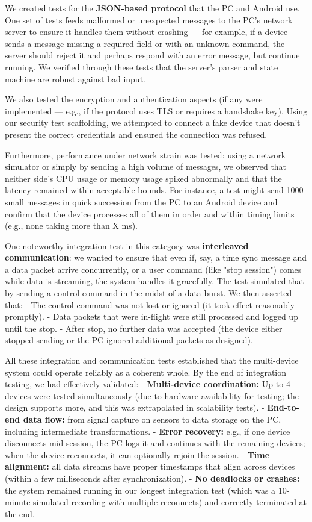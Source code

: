\documentclass[11pt,a4paper]{report}
\begin{document}
We created tests for the \textbf{JSON-based protocol} that the PC and Android
use. One set of tests feeds malformed or unexpected messages to the PC's
network server to ensure it handles them without crashing --- for
example, if a device sends a message missing a required field or with an
unknown command, the server should reject it and perhaps respond with an
error message, but continue running. We verified through these tests
that the server's parser and state machine are robust against bad input.

We also tested the encryption and authentication aspects (if any were
implemented --- e.g., if the protocol uses TLS or requires a handshake
key). Using our security test scaffolding, we attempted to connect a
fake device that doesn't present the correct credentials and ensured the
connection was refused.

Furthermore, performance under network strain was tested: using a
network simulator or simply by sending a high volume of messages, we
observed that neither side's CPU usage or memory usage spiked abnormally
and that the latency remained within acceptable bounds. For instance, a
test might send 1000 small messages in quick succession from the PC to
an Android device and confirm that the device processes all of them in
order and within timing limits (e.g., none taking more than X ms).

One noteworthy integration test in this category was \textbf{interleaved
communication}: we wanted to ensure that even if, say, a time sync
message and a data packet arrive concurrently, or a user command (like
"stop session") comes while data is streaming, the system handles it
gracefully. The test simulated that by sending a control command in the
midst of a data burst. We then asserted that: - The control command was
not lost or ignored (it took effect reasonably promptly). - Data packets
that were in-flight were still processed and logged up until the stop. -
After stop, no further data was accepted (the device either stopped
sending or the PC ignored additional packets as designed).

All these integration and communication tests established that the
multi-device system could operate reliably as a coherent whole. By the
end of integration testing, we had effectively validated: -
\textbf{Multi-device coordination:} Up to 4 devices were tested
simultaneously (due to hardware availability for testing; the design
supports more, and this was extrapolated in scalability tests). -
\textbf{End-to-end data flow:} from signal capture on sensors to data storage
on the PC, including intermediate transformations. - \textbf{Error recovery:}
e.g., if one device disconnects mid-session, the PC logs it and
continues with the remaining devices; when the device reconnects, it can
optionally rejoin the session. - \textbf{Time alignment:} all data streams
have proper timestamps that align across devices (within a few
milliseconds after synchronization). - \textbf{No deadlocks or crashes:} the
system remained running in our longest integration test (which was a
10-minute simulated recording with multiple reconnects) and correctly
terminated at the end.
\end{document}

